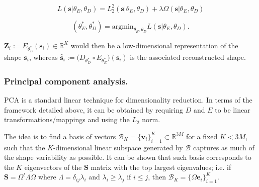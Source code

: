 \documentclass[twocolumn]{llncs}
\begin{document}
\begin{equation}
L(\textbf{s}|\theta_E, \theta_D)= L_2^2(\textbf{s}|\theta_E, \theta_D) + \lambda\Omega(\textbf{s}|\theta_E, \theta_D)
\end{equation}

\begin{equation}
(\theta_E^*, \theta_D^*) = \text{argmin}_{\theta_E, \theta_D}L(\textbf{s}|\theta_E, \theta_D).    
\end{equation}{}


$\textbf{Z}_i:= E_{\theta_E^*}  (\textbf{s}_i)\in\mathbb{R}^{K}$ would then be a low-dimensional representation of the shape $\textbf{s}_i$, whereas $\hat{\textbf{s}}_i:=\big(D_{\theta_D^*} \circ E_{\theta_E^*}\big)(\textbf{s}_i)$ is the associated reconstructed shape.

\subsubsection{Principal component analysis.}
PCA is a standard linear technique for dimensionality reduction. In terms of the framework detailed above, it can be obtained by requiring $D$ and $E$ to be linear transformations/mappings and using the $L_2$ norm.

The idea is to find a basis of vectors $\mathcal{B}_{K}=\{\textbf{v}_i\}_{i=1}^{K}\subset\mathbb{R}^{3M}$ for a fixed $K < 3M$, such that the $K$-dimensional linear subspace generated by $\mathcal{B}$ captures as much of the shape variability as possible. It can be shown that such basis corresponds to the $K$ eigenvectors of the $\textbf{S}$ matrix with the top largest eigenvalues; i.e. if $\textbf{S}=\Omega^{t}\Lambda\Omega$ where $\Lambda=\delta_{ij}\lambda_i$ and $\lambda_i \geq \lambda_j$ if $i\leq j$, then $\mathcal{B}_{K}=\{{\Omega\textbf{e}_i}\}_{i=1}^{K}$.


\end{document}
